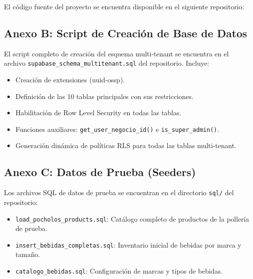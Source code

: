 \documentclass[12pt, a4paper]{article}
\begin{document}
El código fuente del proyecto se encuentra disponible en el siguiente repositorio:

\begin{center}
\end{center}

\subsection*{Anexo B: Script de Creación de Base de Datos}

El script completo de creación del esquema multi-tenant se encuentra en el archivo \texttt{supabase\_schema\_multitenant.sql} del repositorio. Incluye:

\begin{itemize}[leftmargin=2cm]
    \item Creación de extensiones (uuid-ossp).
    \item Definición de las 10 tablas principales con sus restricciones.
    \item Habilitación de Row Level Security en todas las tablas.
    \item Funciones auxiliares: \texttt{get\_user\_negocio\_id()} e \texttt{is\_super\_admin()}.
    \item Generación dinámica de políticas RLS para todas las tablas multi-tenant.
\end{itemize}

\subsection*{Anexo C: Datos de Prueba (Seeders)}

Los archivos SQL de datos de prueba se encuentran en el directorio \texttt{sql/} del repositorio:

\begin{itemize}[leftmargin=2cm]
    \item \texttt{load\_pocholos\_products.sql}: Catálogo completo de productos de la pollería de prueba.
    \item \texttt{insert\_bebidas\_completas.sql}: Inventario inicial de bebidas por marca y tamaño.
    \item \texttt{catalogo\_bebidas.sql}: Configuración de marcas y tipos de bebidas.
\end{itemize}
\end{document}
